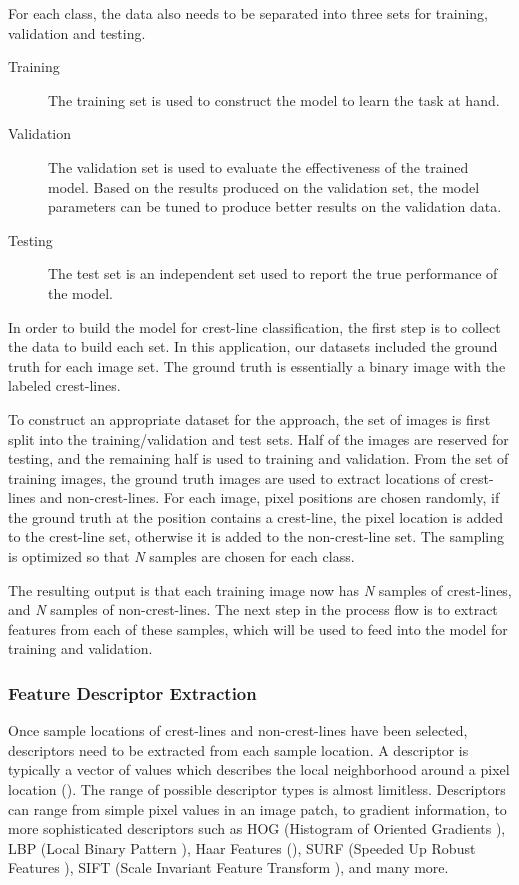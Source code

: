 For each class, the data also needs to be separated into three sets for training, validation and testing. 

\begin{description}
	\item [Training] The training set is used to construct the model to learn the task at hand.
	\item [Validation] The validation set is used to evaluate the effectiveness of the trained model. Based on the results produced on the validation set, the model parameters can be tuned to produce better results on the validation data.
	\item [Testing] The test set is an independent set used to report the true performance of the model.
\end{description}

In order to build the model for crest-line classification, the first step is to collect the data to build each set. In this application, our datasets included the ground truth for each image set. The ground truth is essentially a binary image with the labeled crest-lines. 

To construct an appropriate dataset for the approach, the set of images is first split into the training/validation and test sets. Half of the images are reserved for testing, and the remaining half is used to training and validation. From the set of training images, the ground truth images are used to extract locations of crest-lines and non-crest-lines. For each image, pixel positions are chosen randomly, if the ground truth at the position contains a crest-line, the pixel location is added to the crest-line set, otherwise it is added to the non-crest-line set. The sampling is optimized so that \emph{N} samples are chosen for each class.

The resulting output is that each training image now has \emph{N} samples of crest-lines, and \emph{N} samples of non-crest-lines. The next step in the process flow is to extract features from each of these samples, which will be used to feed into the model for training and validation.

\subsubsection{Feature Descriptor Extraction} \label{subsubsec:feature_descriptor_extraction}

Once sample locations of crest-lines and non-crest-lines have been selected, descriptors need to be extracted from each sample location. A descriptor is typically a vector of values which describes the local neighborhood around a pixel location (\cite{lowe_sift_paper,1994_good_features_to_track,1998_feature_detection,2007_invariant_features_survey}). The range of possible descriptor types is almost limitless. Descriptors can range from simple pixel values in an image patch, to gradient information, to more sophisticated descriptors such as HOG (Histogram of Oriented Gradients \cite{2007_hog_human_detection}), LBP (Local Binary Pattern \cite{1994_lbp_paper,1996_lbp_paper}), Haar Features (\cite{2001_viola_jones_paper}), SURF (Speeded Up Robust Features \cite{2006_surf}), SIFT (Scale Invariant Feature Transform \cite{lowe_sift_paper}), and many more.

